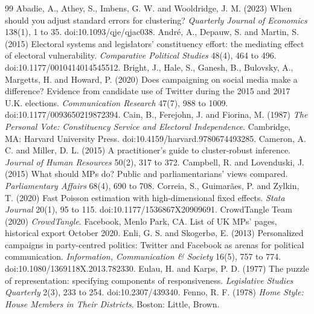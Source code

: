 \documentclass[11pt,a4paper]{article}
\begin{document}
\begin{thebibliography}{99}
 Abadie, A., Athey, S., Imbens, G. W. and Wooldridge, J. M. (2023) When should you adjust standard errors for clustering? \textit{Quarterly Journal of Economics} 138(1), 1 to 35. doi:10.1093/qje/qjac038.
 Andr\'e, A., Depauw, S. and Martin, S. (2015) Electoral systems and legislators' constituency effort: the mediating effect of electoral vulnerability. \textit{Comparative Political Studies} 48(4), 464 to 496. doi:10.1177/0010414014545512.
 Bright, J., Hale, S., Ganesh, B., Bulovsky, A., Margetts, H. and Howard, P. (2020) Does campaigning on social media make a difference? Evidence from candidate use of Twitter during the 2015 and 2017 U.K. elections. \textit{Communication Research} 47(7), 988 to 1009. doi:10.1177/0093650219872394.
 Cain, B., Ferejohn, J. and Fiorina, M. (1987) \textit{The Personal Vote: Constituency Service and Electoral Independence}. Cambridge, MA: Harvard University Press. doi:10.4159/harvard.9780674493285.
 Cameron, A. C. and Miller, D. L. (2015) A practitioner's guide to cluster-robust inference. \textit{Journal of Human Resources} 50(2), 317 to 372.
 Campbell, R. and Lovenduski, J. (2015) What should MPs do? Public and parliamentarians' views compared. \textit{Parliamentary Affairs} 68(4), 690 to 708.
 Correia, S., Guimar\~aes, P. and Zylkin, T. (2020) Fast Poisson estimation with high-dimensional fixed effects. \textit{Stata Journal} 20(1), 95 to 115. doi:10.1177/1536867X20909691.
 CrowdTangle Team (2020) \textit{CrowdTangle}. Facebook, Menlo Park, CA. List of UK MPs' pages, historical export October 2020.
 Enli, G. S. and Skogerb\o, E. (2013) Personalized campaigns in party-centred politics: Twitter and Facebook as arenas for political communication. \textit{Information, Communication \& Society} 16(5), 757 to 774. doi:10.1080/1369118X.2013.782330.
 Eulau, H. and Karps, P. D. (1977) The puzzle of representation: specifying components of responsiveness. \textit{Legislative Studies Quarterly} 2(3), 233 to 254. doi:10.2307/439340.
 Fenno, R. F. (1978) \textit{Home Style: House Members in Their Districts}. Boston: Little, Brown.

\end{thebibliography}
\end{document}
